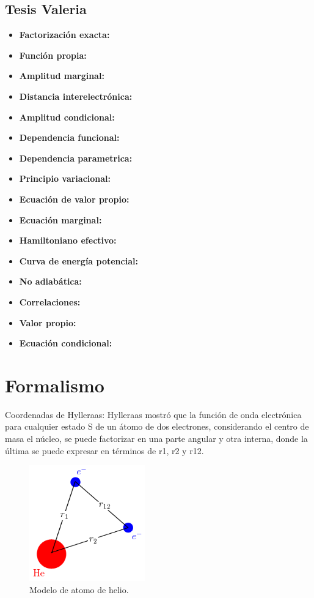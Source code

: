 \documentclass{article}
\begin{document}
\subsection*{Tesis Valeria}
\begin{itemize}
    \item \textbf{Factorización exacta:} 
    \item \textbf{Función propia:}
    \item \textbf{Amplitud marginal:}
    \item \textbf{Distancia interelectrónica:}
    \item \textbf{Amplitud condicional:}
    \item \textbf{Dependencia funcional:}
    \item \textbf{Dependencia parametrica:}
    \item \textbf{Principio variacional:}
    \item \textbf{Ecuación de valor propio:}
    \item \textbf{Ecuación marginal:}
    \item \textbf{Hamiltoniano efectivo:}
    \item \textbf{Curva de energía potencial:}
    \item \textbf{No adiabática:}
    \item \textbf{Correlaciones:}
    \item \textbf{Valor propio:}
    \item \textbf{Ecuación condicional:}
\end{itemize}
\section{Formalismo}
Coordenadas de Hylleraas:
Hylleraas mostró que la función de onda electrónica para
cualquier estado S de un átomo de dos electrones, considerando
el centro de masa el núcleo, se puede factorizar en una parte 
angular y otra interna, donde la última se puede expresar en 
términos de r1, r2 y r12. 

\begin{figure}[htb]
    \centering
    \includegraphics[width=5cm, height=5cm, scale=0.5]{modelo_de_atomo_de_helio.PNG}
    \caption{Modelo de atomo de helio.}
\end{figure}
\end{document}
